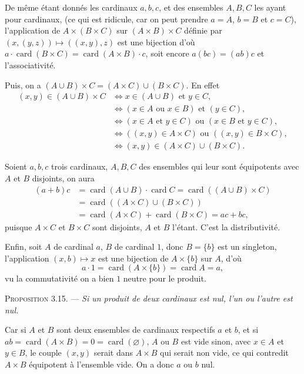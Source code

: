 De même étant donnés les cardinaux $a,b,c$, et des ensembles $A,B,C$ les ayant pour cardinaux, (ce qui est ridicule, car on peut prendre $a=A$, $b=B$ et $c=C$), l'application de $A\times(B\times C)$ sur $(A\times B)\times C$ définie par $(x,(y,z))\mapsto((x,y),z)$ est une bijection d'où $a\cdot\operatorname{card}(B\times C)=\operatorname{card}(A\times B)\cdot c$, soit encore $a(bc)=(ab)c$ et l'associativité.

Puis, on a $(A\cup B)\times C=(A\times C)\cup(B\times C)$. En effet
\begin{align*}
(x,y)\in(A\cup B)\times C
&\Leftrightarrow x\in(A\cup B)\text{ et }y\in C,\\
&\Leftrightarrow (x\in A\text{ ou }x\in B)\text{ et }(y\in C),\\
&\Leftrightarrow (x\in A\text{ et }y\in C)\text{ ou }(x\in B\text{ et }y\in C),\\
&\Leftrightarrow ((x,y)\in A\times C)\text{ ou }((x,y)\in B\times C),\\
&\Leftrightarrow (x,y)\in(A\times C)\cup(B\times C).
\end{align*}

Soient $a,b,c$ trois cardinaux, $A,B,C$ des ensembles qui leur sont équipotents avec $A$ et $B$ disjoints, on aura
\begin{align*}
(a+b)c&=\operatorname{card}(A\cup B)\cdot\operatorname{card}C
=\operatorname{card}((A\cup B)\times C)\\
&=\operatorname{card}((A\times C)\cup(B\times C))\\
&=\operatorname{card}(A\times C)+\operatorname{card}(B\times C)=ac+bc,
\end{align*}
puisque $A\times C$ et $B\times C$ sont disjoints, $A$ et $B$ l'étant. C'est la distributivité.

Enfin, soit $A$ de cardinal $a$, $B$ de cardinal $1$, donc $B=\{b\}$ est un singleton, l'application $(x,b)\mapsto x$ est une bijection de $A\times\{b\}$ sur $A$, d'où
\[
a\cdot1=\operatorname{card}(A\times\{b\})=\operatorname{card}A=a,
\]
vu la commutativité on a bien $1$ neutre pour le produit. \bookend

\medskip\noindent\textsc{Proposition 3.15.} --- \emph{Si un produit de deux cardinaux est nul, l'un ou l'autre est nul.}

Car si $A$ et $B$ sont deux ensembles de cardinaux respectifs $a$ et $b$, et si $ab=\operatorname{card}(A\times B)=0=\operatorname{card}(\varnothing)$, $A$ ou $B$ est vide sinon, avec $x\in A$ et $y\in B$, le couple $(x,y)$ serait dans $A\times B$ qui serait non vide, ce qui contredit $A\times B$ équipotent à l'ensemble vide. On a donc $a$ ou $b$ nul. \bookend

